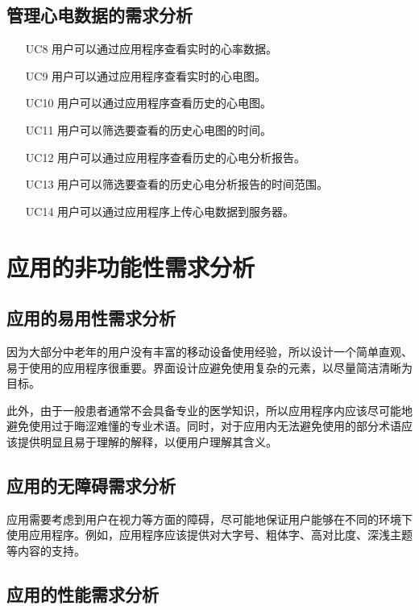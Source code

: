 \subsection{管理心电数据的需求分析}\label{subsec:ecg-req}

\begin{itemize}
    \item[UC8] 用户可以通过应用程序查看实时的心率数据。
    \item[UC9] 用户可以通过应用程序查看实时的心电图。
    \item[UC10] 用户可以通过应用程序查看历史的心电图。
    \item[UC11] 用户可以筛选要查看的历史心电图的时间。
    \item[UC12] 用户可以通过应用程序查看历史的心电分析报告。
    \item[UC13] 用户可以筛选要查看的历史心电分析报告的时间范围。
    \item[UC14] 用户可以通过应用程序上传心电数据到服务器。
\end{itemize}


\section{应用的非功能性需求分析}\label{sec:nonfunc-req}

\subsection{应用的易用性需求分析}\label{subsec:usability}

因为大部分中老年的用户没有丰富的移动设备使用经验，所以设计一个简单直观、易于使用的应用程序很重要。界面设计应避免使用复杂的元素，以尽量简洁清晰为目标。

此外，由于一般患者通常不会具备专业的医学知识，所以应用程序内应该尽可能地避免使用过于晦涩难懂的专业术语。同时，对于应用内无法避免使用的部分术语应该提供明显且易于理解的解释，以便用户理解其含义。

\subsection{应用的无障碍需求分析}\label{subsec:accessibility}

应用需要考虑到用户在视力等方面的障碍，尽可能地保证用户能够在不同的环境下使用应用程序。例如，应用程序应该提供对大字号、粗体字、高对比度、深浅主题等内容的支持。

\subsection{应用的性能需求分析}\label{subsec:performance}

